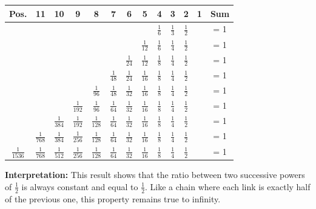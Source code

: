 \documentclass[a4paper,11pt]{article}
\newenvironment{resume}{%
    \begin{tcolorbox}[colback=purple!5,colframe=holpurple,title={\textbf{Visual Summary}}]
}{%
    \end{tcolorbox}
}
\begin{document}
\begin{center}
\scriptsize
\begin{tabular}{|c|c|c|c|c|c|c|c|c|c|c|c|c|}
\hline
\textbf{Pos.} & 11 & 10 & 9 & 8 & 7 & 6 & 5 & 4 & 3 & 2 & 1 & \textbf{Sum} \\
\hline
& & & & & & & & $\frac{1}{6}$ & $\frac{1}{3}$ & $\frac{1}{2}$ & & = 1 \\
\hline
& & & & & & & $\frac{1}{12}$ & $\frac{1}{6}$ & $\frac{1}{4}$ & $\frac{1}{2}$ & & = 1 \\
\hline
& & & & & & $\frac{1}{24}$ & $\frac{1}{12}$ & $\frac{1}{8}$ & $\frac{1}{4}$ & $\frac{1}{2}$ & & = 1 \\
\hline
& & & & & $\frac{1}{48}$ & $\frac{1}{24}$ & $\frac{1}{16}$ & $\frac{1}{8}$ & $\frac{1}{4}$ & $\frac{1}{2}$ & & = 1 \\
\hline
& & & & $\frac{1}{96}$ & $\frac{1}{48}$ & $\frac{1}{32}$ & $\frac{1}{16}$ & $\frac{1}{8}$ & $\frac{1}{4}$ & $\frac{1}{2}$ & & = 1 \\
\hline
& & & $\frac{1}{192}$ & $\frac{1}{96}$ & $\frac{1}{64}$ & $\frac{1}{32}$ & $\frac{1}{16}$ & $\frac{1}{8}$ & $\frac{1}{4}$ & $\frac{1}{2}$ & & = 1 \\
\hline
& & $\frac{1}{384}$ & $\frac{1}{192}$ & $\frac{1}{128}$ & $\frac{1}{64}$ & $\frac{1}{32}$ & $\frac{1}{16}$ & $\frac{1}{8}$ & $\frac{1}{4}$ & $\frac{1}{2}$ & & = 1 \\
\hline
& $\frac{1}{768}$ & $\frac{1}{384}$ & $\frac{1}{256}$ & $\frac{1}{128}$ & $\frac{1}{64}$ & $\frac{1}{32}$ & $\frac{1}{16}$ & $\frac{1}{8}$ & $\frac{1}{4}$ & $\frac{1}{2}$ & & = 1 \\
\hline
$\frac{1}{1536}$ & $\frac{1}{768}$ & $\frac{1}{512}$ & $\frac{1}{256}$ & $\frac{1}{128}$ & $\frac{1}{64}$ & $\frac{1}{32}$ & $\frac{1}{16}$ & $\frac{1}{8}$ & $\frac{1}{4}$ & $\frac{1}{2}$ & & = 1 \\
\hline
\end{tabular}
\end{center}

\begin{resume}
\textbf{Interpretation:} This result shows that the ratio between two successive powers of $\frac{1}{2}$ is always constant and equal to $\frac{1}{2}$. Like a chain where each link is exactly half of the previous one, this property remains true to infinity.
\end{resume}

\end{document}
